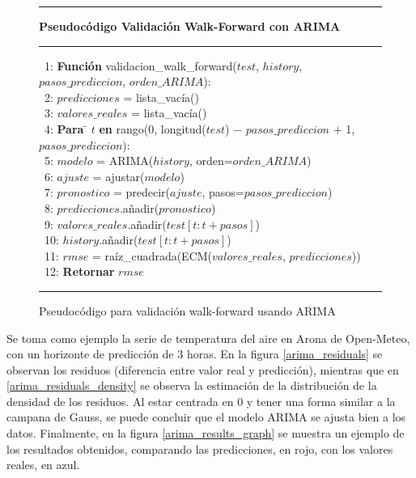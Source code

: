 \begin{figure}[H]
{\small
\hrule
{\bf\small Pseudocódigo Validación Walk-Forward con ARIMA}
\hrule
\begin{center}
\begin{tabbing}
\ 1: {\bf Fun}\={\bf ción} validacion\_walk\_forward($test$, $history$, $pasos\_prediccion$, $orden\_ARIMA$): \\
\ 2: \> $predicciones$ = lista\_vacía() \\
\ 3: \> $valores\_reales$ = lista\_vacía() \\
\ 4: \> {\bf Para} \= $t$ {\bf en} rango(0, longitud($test$) $-$ $pasos\_prediccion$ $+$ 1, $pasos\_prediccion$): \\
\ 5: \> \> $modelo$ = ARIMA($history$, orden=$orden\_ARIMA$) \\
\ 6: \> \> $ajuste$ = ajustar($modelo$) \\
\ 7: \> \> $pronostico$ = predecir($ajuste$, pasos=$pasos\_prediccion$) \\
\ 8: \> \> $predicciones$.añadir($pronostico$) \\
\ 9: \> \> $valores\_reales$.añadir($test[t : t+pasos]$) \\
\ 10: \> \> $history$.añadir($test[t : t+pasos]$) \\
\ 11: \> $rmse$ = raíz\_cuadrada(ECM($valores\_reales$, $predicciones$)) \\
\ 12: \> {\bf Retornar} $rmse$ \\
\end{tabbing}
\end{center}
}
\hrule
\caption{Pseudocódigo para validación walk-forward usando ARIMA}
\label{walk_forward_arima}
\end{figure}

Se toma como ejemplo la serie de temperatura del aire en Arona de Open-Meteo, con un horizonte de predicción de 3 horas. En la figura \ref{arima_residuals} se observan los residuos (diferencia entre valor real y predicción), mientras que en \ref{arima_residuals_density} se observa la estimación de la distribución de la densidad de los residuos.
Al estar centrada en 0 y tener una forma similar a la campana de Gauss, se puede concluir que el modelo ARIMA se ajusta bien a los datos. Finalmente, en la figura 
\ref{arima_results_graph} se muestra un ejemplo de los resultados obtenidos, comparando las predicciones, en rojo, con los valores reales, en azul.

